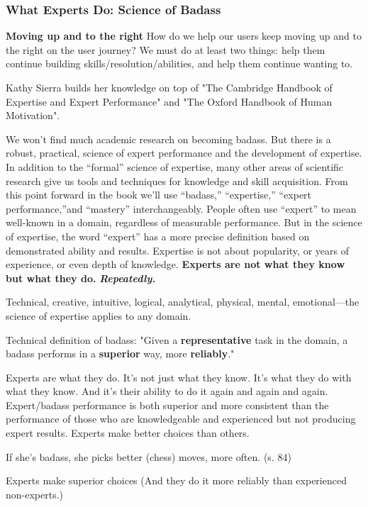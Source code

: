 \subsubsection{What Experts Do: Science of Badass}
\textbf{Moving up and to the right}
How do we help our users keep moving up and to the right on the user journey? We must do at least two things: help them continue building skills/resolution/abilities, and help them continue wanting to.

Kathy Sierra builds her knowledge on top of "The Cambridge Handbook of Expertise and Expert Performance" and "The Oxford Handbook of Human Motivation".

We won’t find much academic research on becoming badass. But there is a robust, practical, science of expert performance and the development of expertise. In addition to the “formal” science of expertise, many other areas of scientific research give us tools and techniques for knowledge and skill acquisition.
From this point forward in the book we’ll use “badass,” “expertise,” “expert performance,”and “mastery” interchangeably. People often use “expert” to mean well-known in a domain, regardless of measurable performance. But in the science of expertise, the word “expert” has a more precise definition based on demonstrated ability and results.
Expertise is not about popularity, or years of experience, or even depth of knowledge.
\textbf{Experts are not what they know but what they do.}
\textbf{\textit{Repeatedly.}}

Technical, creative, intuitive, logical, analytical, physical, mental, emotional—the science of expertise applies to any domain.

Technical definition of badass: "Given a \textbf{representative} task in the domain, a badass performs in a \textbf{superior} way, more \textbf{reliably}."

Experts are what they do.
It’s not just what they know.
It’s what they do with what they know.
And it’s their ability to do it again and again and again.
Expert/badass performance is both superior and more consistent than the performance of those who are knowledgeable and experienced but not producing expert results.
Experts make better choices than others.

If she’s badass, she picks better (chess) moves, more often. (s. 84)

Experts make superior choices
(And they do it more reliably than experienced non-experts.)

